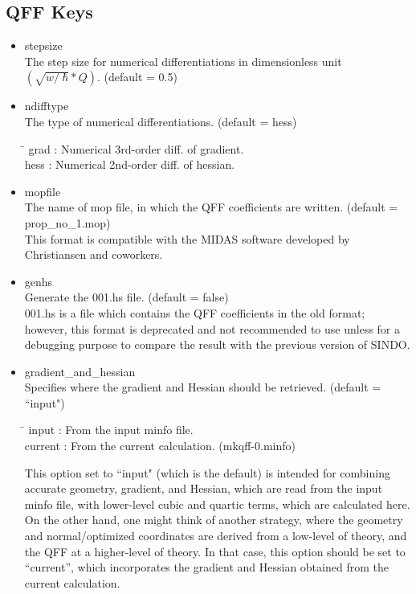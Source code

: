 \documentclass[a4paper,12pt]{article}
\begin{document}
\subsection{QFF Keys} \label{qffKey}
   \begin{itemize}
     \item stepsize \\
       The step size for numerical differentiations in dimensionless unit $(\sqrt{w /\ \hbar} * Q)$. (default = 0.5) 
     \item ndifftype \\
      The type of numerical differentiations. (default = hess)
      \begin{tabbing}
         \hspace{20mm} \= \hspace{30mm} \kill
           grad  \> : Numerical 3rd-order diff. of gradient.\\
           hess  \> : Numerical 2nd-order diff. of hessian. 
      \end{tabbing}      
     \item mopfile \\
       The name of mop file, in which the QFF coefficients are written.  (default = prop\_no\_1.mop) \\
       This format is compatible with the MIDAS software developed by Christiansen and coworkers.
     \item genhs \\
       Generate the 001.hs file. (default = false) \\
       001.hs is a file which contains the QFF coefficients in the old format; however, this format is deprecated and not recommended 
       to use unless for a debugging purpose to compare the result with the previous version of SINDO.  \\
     \item gradient\_and\_hessian  \\
       Specifies where the gradient and Hessian should be retrieved.  (default = ``input") 
       \begin{tabbing}
         \hspace{20mm} \= \hspace{30mm} \kill
           input     \> : From the input minfo file. \\
           current   \> : From the current calculation. (mkqff-0.minfo)\\
       \end{tabbing}      
       This option set to ``input" (which is the default) is intended for combining accurate geometry, gradient, and Hessian, which 
       are read from the input minfo file, with lower-level cubic and quartic terms, which are calculated here. On the other hand, one 
       might think of another strategy, where the geometry and normal/optimized coordinates are derived from a low-level of theory, and 
       the QFF at a higher-level of theory. In that case, this option should be set to ``current'', which incorporates the gradient and 
       Hessian obtained from the current calculation. 
   \end{itemize}
                 
\end{document}
